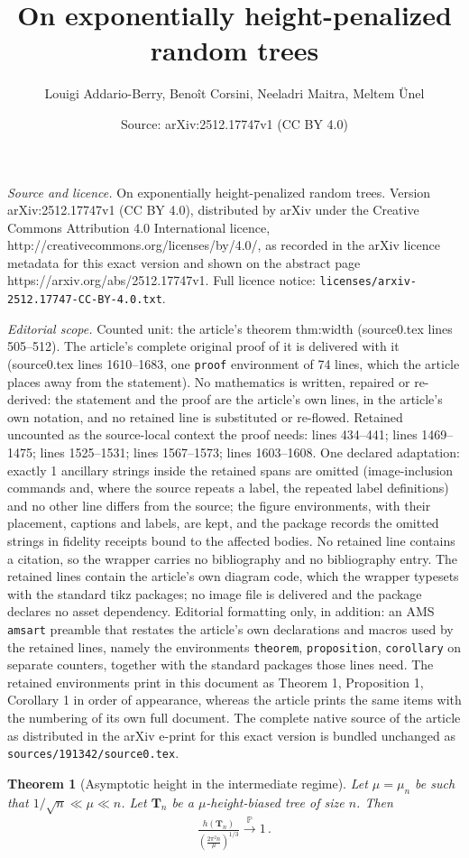 \documentclass[10pt,a4paper]{amsart}
\title{On exponentially height-penalized random trees}
\author{Louigi Addario-Berry, Beno\^it Corsini, Neeladri Maitra, Meltem \"Unel}
\date{Source: arXiv:2512.17747v1 (CC BY 4.0)}
\newtheorem{theorem}{Theorem}
\newcommand{\toinp}{\overset{\mathbb P}{\longrightarrow}}
\begin{document}
\maketitle

\noindent\emph{Source and licence.} On exponentially height-penalized random trees. Version arXiv:2512.17747v1 (CC BY 4.0), distributed by arXiv under the Creative Commons Attribution 4.0 International licence, http://creativecommons.org/licenses/by/4.0/, as recorded in the arXiv licence metadata for this exact version and shown on the abstract page https://arxiv.org/abs/2512.17747v1. Full licence notice: \texttt{licenses/arxiv-2512.17747-CC-BY-4.0.txt}.\par\smallskip

\noindent\textit{Editorial scope.} Counted unit: the article's theorem thm:width (source0.tex lines 505--512). The article's complete original proof of it is delivered with it (source0.tex lines 1610--1683, one \texttt{proof} environment of 74 lines, which the article places away from the statement). No mathematics is written, repaired or re-derived: the statement and the proof are the article's own lines, in the article's own notation, and no retained line is substituted or re-flowed.  Retained uncounted as the source-local context the proof needs: lines 434--441; lines 1469--1475; lines 1525--1531; lines 1567--1573; lines 1603--1608.  One declared adaptation: exactly 1 ancillary strings inside the retained spans are omitted (image-inclusion commands and, where the source repeats a label, the repeated label definitions) and no other line differs from the source; the figure environments, with their placement, captions and labels, are kept, and the package records the omitted strings in fidelity receipts bound to the affected bodies.  No retained line contains a citation, so the wrapper carries no bibliography and no bibliography entry.  The retained lines contain the article's own diagram code, which the wrapper typesets with the standard tikz packages; no image file is delivered and the package declares no asset dependency.  Editorial formatting only, in addition: an AMS \texttt{amsart} preamble that restates the article's own declarations and macros used by the retained lines, namely the environments \texttt{theorem}, \texttt{proposition}, \texttt{corollary} on separate counters, together with the standard packages those lines need.  The retained environments print in this document as Theorem 1, Proposition 1, Corollary 1 in order of appearance, whereas the article prints the same items with the numbering of its own full document.  The complete native source of the article as distributed in the arXiv e-print for this exact version is bundled unchanged as \texttt{sources/191342/source0.tex}.
\begin{theorem}[Asymptotic height in the intermediate regime]\label{thm:inter lln}
    Let $\mu=\mu_n$ be such that $1/\sqrt{n}\ll\mu\ll n$.
    Let $\mathbf{T}_n$ be a $\mu$-height-biased tree of size $n$.
    Then
    \begin{align*}
        \frac{h(\mathbf{T}_n)}{\left(\frac{2\pi^2n}{\mu}\right)^{1/3}}\toinp 1\,.
    \end{align*}
\end{theorem}
\end{document}
